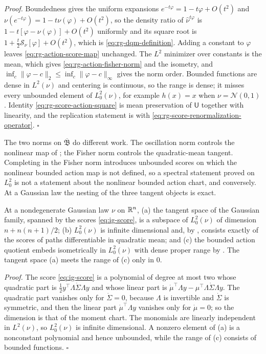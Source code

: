 \noindent\emph{Proof.}
Boundedness gives the uniform expansions \(e^{-t\varphi}=1-t\varphi+O(t^2)\) and
\(\nu(e^{-t\varphi})=1-t\nu(\varphi)+O(t^2)\), so the density ratio of
\(\widehat\nu^{t\varphi}\) is \(1-t[\varphi-\nu(\varphi)]+O(t^2)\) uniformly and its square
root is \(1+\tfrac t2\mathscr S_\nu[\varphi]+O(t^2)\), which is
\eqref{eq:rg-dqm-definition}. Adding a constant to \(\varphi\) leaves
\eqref{eq:rg-action-score-map} unchanged. The \(L^2\) minimizer over constants is the
mean, which gives \eqref{eq:rg-action-fisher-norm} and the isometry, and
\(\inf_c\lVert\varphi-c\rVert_2\leq\inf_c\lVert\varphi-c\rVert_\infty\) gives the norm
order. Bounded functions are dense in \(L^2(\nu)\) and centering is continuous, so the
range is dense; it misses every unbounded element of \(L^2_0(\nu)\), for example
\(h(x)=x\) when \(\nu=\mathcal N(0,1)\). Identity \eqref{eq:rg-score-action-square} is mean
preservation of \(\mathsf U\) together with linearity, and the replication statement is
 with \eqref{eq:rg-score-renormalization-operator}.
\hfill$\square$

\medskip
The two norms on \(\overline{\mathfrak B}\) do different work. The oscillation norm
controls the nonlinear map of ; the Fisher norm
controls the quadratic-mean tangent. Completing in the Fisher norm introduces
unbounded scores on which the nonlinear bounded action map is not defined, so a
spectral statement proved on \(L^2_0\) is not a statement about the nonlinear bounded
action chart, and conversely. At a Gaussian law the nesting of the three tangent
objects is exact.

At a nondegenerate Gaussian law \(\nu\) on \(\mathbb R^n\), (a) the tangent space of the
Gaussian family, spanned by the scores \eqref{eq:ig-score}, is a subspace of
\(L^2_0(\nu)\) of dimension \(n+n(n+1)/2\); (b) \(L^2_0(\nu)\) is infinite dimensional and,
by , consists exactly of the scores of paths
differentiable in quadratic mean; and (c) the bounded action quotient embeds
isometrically in \(L^2_0(\nu)\) with dense proper range by
. The tangent space (a) meets the range of (c) only
in \(0\). 

\noindent\emph{Proof.}
The score \eqref{eq:ig-score} is a polynomial of degree at most two whose quadratic part
is \(\tfrac12y^\top\Lambda\dot\Sigma\Lambda y\) and whose linear part is
\(\dot\mu^\top\Lambda y-\mu^\top\Lambda\dot\Sigma\Lambda y\). The quadratic part vanishes
only for \(\dot\Sigma=0\), because \(\Lambda\) is invertible and \(\dot\Sigma\) is
symmetric, and then the linear part \(\dot\mu^\top\Lambda y\) vanishes only for
\(\dot\mu=0\); so the dimension is that of the moment chart. The
monomials are linearly independent in \(L^2(\nu)\), so \(L^2_0(\nu)\) is infinite
dimensional. A nonzero element of (a) is a nonconstant polynomial and hence unbounded,
while the range of (c) consists of bounded functions. \hfill$\square$

